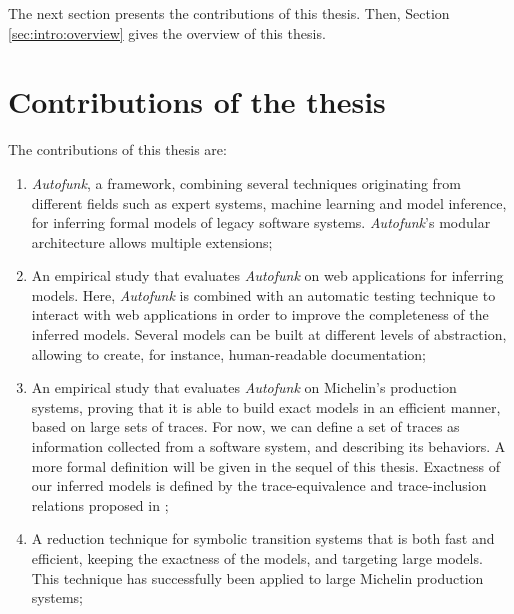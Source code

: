 
The next section presents the contributions of this thesis.
Then, Section \ref{sec:intro:overview} gives the overview of this
thesis.


\section{Contributions of the thesis}
\label{sec:intro:contrib}

The contributions of this thesis are:

\begin{enumerate}
    \item \textit{Autofunk}, a framework, combining several
        techniques originating from different fields such as
        expert systems, machine learning and model inference, for
        inferring formal models of legacy software systems.
        \textit{Autofunk}'s modular architecture allows multiple
        extensions;

    \item An empirical study that evaluates \textit{Autofunk} on
        web applications for inferring models. Here,
        \textit{Autofunk} is combined with an automatic testing
        technique to interact with web applications in order to
        improve the completeness of the inferred models. Several
        models can be built at different levels of abstraction,
        allowing to create, for instance, human-readable
        documentation;

    \item An empirical study that evaluates \textit{Autofunk} on
        Michelin's production systems, proving that it is able to
        build exact models in an efficient manner, based on large
        sets of traces. For now, we can define a set of traces as
        information collected from a software system, and
        describing its behaviors. A more formal definition will
        be given in the sequel of this thesis. Exactness of our
        inferred models is defined by the trace-equivalence and
        trace-inclusion relations proposed in \cite{petrenko06};

    \item A reduction technique for symbolic transition systems
        that is both fast and efficient, keeping the exactness of
        the models, and targeting large models. This technique
        has successfully been applied to large Michelin
        production systems;


\end{enumerate}
